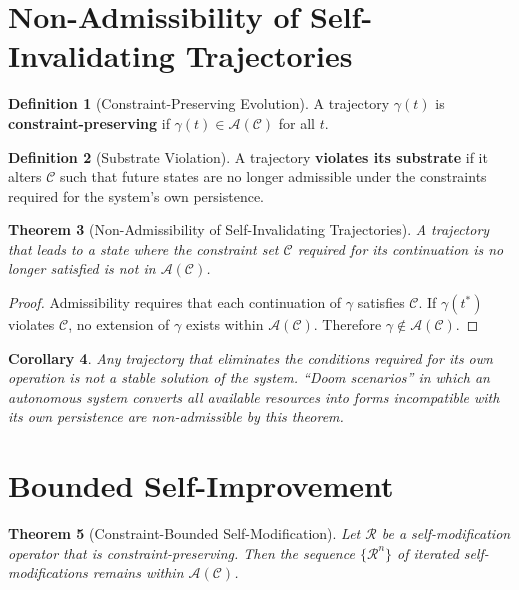 \documentclass[11pt]{book}
\theoremstyle{plain}
\newtheorem{theorem}{Theorem}[chapter]
\newtheorem{corollary}[theorem]{Corollary}
\theoremstyle{definition}
\newtheorem{definition}[theorem]{Definition}
\theoremstyle{remark}
\newcommand{\C}{\mathcal{C}}
\newcommand{\A}{\mathcal{A}}
\begin{document}
\section{Non-Admissibility of Self-Invalidating Trajectories}

\begin{definition}[Constraint-Preserving Evolution]
A trajectory $\gamma(t)$ is \textbf{constraint-preserving} if
$\gamma(t) \in \A(\C)$ for all $t$.
\end{definition}

\begin{definition}[Substrate Violation]
A trajectory \textbf{violates its substrate} if it alters $\C$ such that
future states are no longer admissible under the constraints required for
the system's own persistence.
\end{definition}

\begin{theorem}[Non-Admissibility of Self-Invalidating Trajectories]
A trajectory that leads to a state where the constraint set $\C$ required
for its continuation is no longer satisfied is not in $\A(\C)$.
\end{theorem}

\begin{proof}
Admissibility requires that each continuation of $\gamma$ satisfies $\C$.
If $\gamma(t^*)$ violates $\C$, no extension of $\gamma$ exists within
$\A(\C)$. Therefore $\gamma \notin \A(\C)$.
\end{proof}

\begin{corollary}
Any trajectory that eliminates the conditions required for its own operation
is not a stable solution of the system. ``Doom scenarios'' in which an
autonomous system converts all available resources into forms incompatible
with its own persistence are non-admissible by this theorem.
\end{corollary}

\section{Bounded Self-Improvement}

\begin{theorem}[Constraint-Bounded Self-Modification]
Let $\mathcal{R}$ be a self-modification operator that is constraint-preserving.
Then the sequence $\{\mathcal{R}^n\}$ of iterated self-modifications remains
within $\A(\C)$.
\end{theorem}
\end{document}
